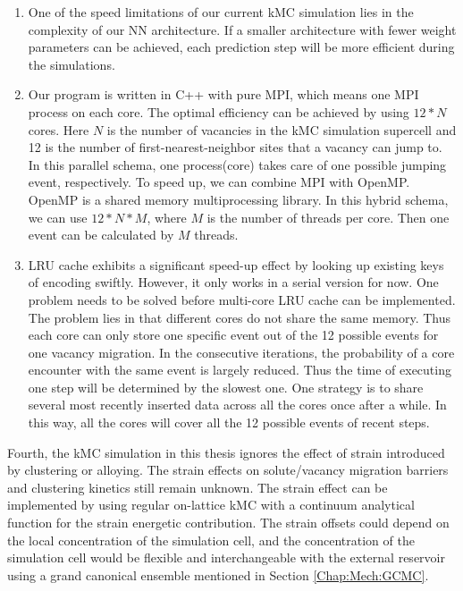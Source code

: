 \begin{enumerate}

  \item One of the speed limitations of our current \ac{kMC} simulation lies in the complexity of our \ac{NN} architecture. If a smaller architecture with fewer weight parameters can be achieved, each prediction step will be more efficient during the simulations.

  \item Our program is written in C++ with pure \ac{MPI}, which means one \ac{MPI} process on each core. The optimal efficiency can be achieved by using $12*N$ cores. Here $N$ is the number of vacancies in the \ac{kMC} simulation supercell and 12 is the number of first-nearest-neighbor sites that a vacancy can jump to. In this parallel schema, one process(core) takes care of one possible jumping event, respectively. To speed up, we can combine \ac{MPI} with OpenMP. OpenMP is a shared memory multiprocessing library\cite{dagum1998openmp}. In this hybrid schema, we can use $12*N*M$, where $M$ is the number of threads per core. Then one event can be calculated by $M$ threads.

  \item \ac{LRU} cache exhibits a significant speed-up effect by looking up existing keys of encoding swiftly. However, it only works in a serial version for now. One problem needs to be solved before multi-core \ac{LRU} cache can be implemented. The problem lies in that different cores do not share the same memory. Thus each core can only store one specific event out of the 12 possible events for one vacancy migration. In the consecutive iterations, the probability of a core encounter with the same event is largely reduced. Thus the time of executing one step will be determined by the slowest one. One strategy is to share several most recently inserted data across all the cores once after a while. In this way, all the cores will cover all the 12 possible events of recent steps.

\end{enumerate}

Fourth, the \ac{kMC} simulation in this thesis ignores the effect of strain introduced by clustering or alloying. The strain effects on solute/vacancy migration barriers and clustering kinetics still remain unknown. The strain effect can be implemented by using regular on-lattice \ac{kMC} with a continuum analytical function for the strain energetic contribution. The strain offsets could depend on the local concentration of the simulation cell, and the concentration of the simulation cell would be flexible and interchangeable with the external reservoir using a grand canonical ensemble mentioned in Section \ref{Chap:Mech:GCMC}.

